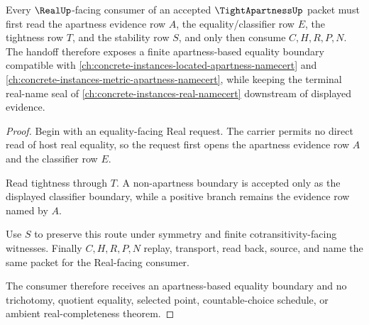 \begin{theorem}
\label{thm:tight-apartness-real-apartness-handoff}
Every $\RealUp$-facing consumer of an accepted $\TightApartnessUp$ packet must first read the apartness evidence row $A$, the equality/classifier row $E$, the tightness row $T$, and the stability row $S$, and only then consume $C,H,R,P,N$. The handoff therefore exposes a finite apartness-based equality boundary compatible with \autoref{ch:concrete-instances-located-apartness-namecert} and \autoref{ch:concrete-instances-metric-apartness-namecert}, while keeping the terminal real-name seal of \autoref{ch:concrete-instances-real-namecert} downstream of displayed evidence.
\end{theorem}
\begin{proof}
Begin with an equality-facing Real request. The carrier permits no direct read of host real equality, so the request first opens the apartness evidence row $A$ and the classifier row $E$.

Read tightness through $T$. A non-apartness boundary is accepted only as the displayed classifier boundary, while a positive branch remains the evidence row named by $A$.

Use $S$ to preserve this route under symmetry and finite cotransitivity-facing witnesses. Finally $C,H,R,P,N$ replay, transport, read back, source, and name the same packet for the Real-facing consumer.

The consumer therefore receives an apartness-based equality boundary and no trichotomy, quotient equality, selected point, countable-choice schedule, or ambient real-completeness theorem.
\end{proof}




